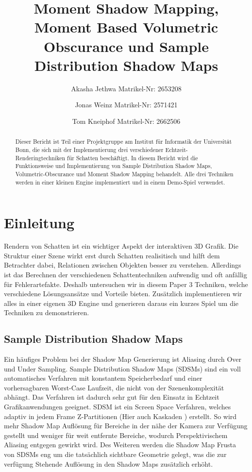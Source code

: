 \documentclass[runningheaders,a4paper]{llncs}
\title{ Moment Shadow Mapping, Moment Based Volumetric Obscurance und Sample Distribution Shadow Maps }
\author{
	Akasha Jethwa 
	Matrikel-Nr: 2653208
	\and
	Jonas Weinz 
	Matrikel-Nr: 2571421
	\and
	Tom Kneiphof 
	Matrikel-Nr: 2662506
}
\institute{Institut für Informatik der Universität Bonn}
\begin{document}
\maketitle

\begin{abstract}
Dieser Bericht ist Teil einer Projektgruppe am Institut für Informatik der Universität Bonn,
die sich mit der Implementierung drei verschiedener Echtzeit-Renderingtechniken für Schatten beschäftigt.
In diesem Bericht wird die Funktionsweise und Implementierung von Sample Distribution Shadow Maps, Volumetric-Obscurance und Moment Shadow Mapping behandelt.
Alle drei Techniken werden in einer kleinen Engine implementiert und in einem Demo-Spiel verwendet.
\end{abstract}


\section{Einleitung}
Rendern von Schatten ist ein wichtiger Aspekt der interaktiven 3D Grafik.
Die Struktur einer Szene wirkt erst durch Schatten realisitisch und hilft dem Betrachter dabei, Relationen zwischen Objekten besser zu verstehen.
Allerdings ist das Berechnen der verschiedenen Schattentechniken aufwendig und oft anfällig für Fehlerartefakte.
Deshalb untersuchen wir in diesem Paper 3 Techniken, welche verschiedene Lösungsansätze und Vorteile bieten.
Zusätzlich implementieren wir alles in einer eigenen 3D Engine und generieren daraus ein kurzes Spiel um die Techniken zu demonstrieren.


\subsection{Sample Distribution Shadow Maps}

Ein häufiges Problem bei der Shadow Map Generierung ist Aliasing durch Over und Under Sampling.
Sample Distribution Shadow Maps (SDSMs) \cite{sdsm} sind ein voll automatisches Verfahren mit konstantem Speicherbedarf und einer vorhersagbaren Worst-Case Laufzeit, die nicht von der Szenenkomplexität abhängt.
Das Verfahren ist dadurch sehr gut für den Einsatz in Echtzeit Grafikanwendungen geeignet.
SDSM ist ein Screen Space Verfahren, welches adaptiv in jedem Frame Z-Partitionen \cite{zpart} (Hier auch Kaskaden \cite{csm}) erstellt.
So wird mehr Shadow Map Auflösung für Bereiche in der nähe der Kamera zur Verfügung gestellt und weniger für weit entfernte Bereiche, wodurch Perspektivischem Aliasing entgegen gewirkt wird.
Des Weiteren werden die Shadow Map Frusta von SDSMs eng um die tatsächlich sichtbare Geometrie gelegt, was die zur verfügung Stehende Auflösung in den Shadow Maps zusätzlich erhöht.
\end{document}
